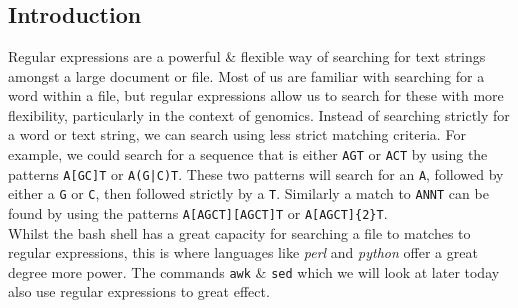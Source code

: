 
\chapter{\moduleTitle}
\newpage

\section{Introduction}
Regular expressions are a powerful \& flexible way of searching for text strings amongst a large document or file.
Most of us are familiar with searching for a word within a file, but regular expressions allow us to search for these with more flexibility, particularly in the context of genomics.
Instead of searching strictly for a word or text string, we can search using less strict matching criteria.
For example, we could search for a sequence that is either \texttt{AGT} or \texttt{ACT} by using the patterns  \texttt{A[GC]T} or  \texttt{A(G|C)T}.
These two patterns will search for an  \texttt{A}, followed by either a  \texttt{G} or  \texttt{C}, then followed strictly by a  \texttt{T}.
Similarly a match to \texttt{ANNT} can be found by using the patterns \texttt{A[AGCT][AGCT]T} or  \texttt{A[AGCT]\{2\}T}. \\

Whilst the bash shell has a great capacity for searching a file to matches to regular expressions, this is where languages like \textit{perl} and \textit{python} offer a great degree more power.
The commands \texttt{awk} \& \texttt{sed} which we will look at later today also use regular expressions to great effect.

